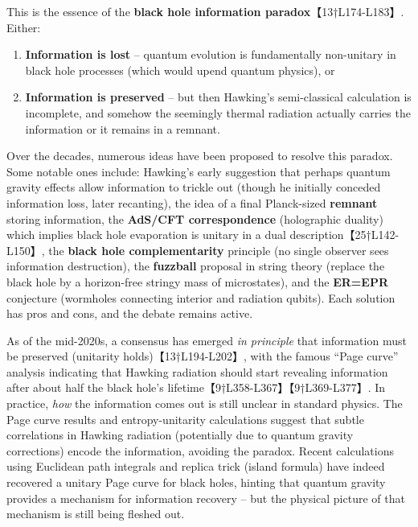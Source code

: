 \documentclass[]{article}
\begin{document}
This is the essence of the \textbf{black hole information
paradox}【13†L174-L183】. Either:

\begin{enumerate}
\def\labelenumi{\arabic{enumi}.}
\item
  \textbf{Information is lost} -- quantum evolution is fundamentally
  non-unitary in black hole processes (which would upend quantum
  physics), or
\item
  \textbf{Information is preserved} -- but then Hawking's semi-classical
  calculation is incomplete, and somehow the seemingly thermal radiation
  actually carries the information or it remains in a remnant.
\end{enumerate}

Over the decades, numerous ideas have been proposed to resolve this
paradox. Some notable ones include: Hawking's early suggestion that
perhaps quantum gravity effects allow information to trickle out (though
he initially conceded information loss, later recanting), the idea of a
final Planck-sized \textbf{remnant} storing information, the
\textbf{AdS/CFT correspondence} (holographic duality) which implies
black hole evaporation is unitary in a dual description【25†L142-L150】,
the \textbf{black hole complementarity} principle (no single observer
sees information destruction), the \textbf{fuzzball} proposal in string
theory (replace the black hole by a horizon-free stringy mass of
microstates), and the \textbf{ER=EPR} conjecture (wormholes connecting
interior and radiation qubits). Each solution has pros and cons, and the
debate remains active.

As of the mid-2020s, a consensus has emerged \emph{in principle} that
information must be preserved (unitarity holds)【13†L194-L202】, with
the famous ``Page curve'' analysis indicating that Hawking radiation
should start revealing information after about half the black hole's
lifetime【9†L358-L367】【9†L369-L377】. In practice, \emph{how} the
information comes out is still unclear in standard physics. The Page
curve results and entropy-unitarity calculations suggest that subtle
correlations in Hawking radiation (potentially due to quantum gravity
corrections) encode the information, avoiding the paradox. Recent
calculations using Euclidean path integrals and replica trick (island
formula) have indeed recovered a unitary Page curve for black holes,
hinting that quantum gravity provides a mechanism for information
recovery -- but the physical picture of that mechanism is still being
fleshed out.
\end{document}
